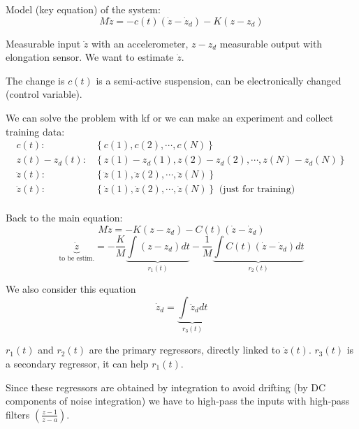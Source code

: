 \begin{exa}
    Model (key equation) of the system:
    \[
        M\ddot{z} = -c(t)(\dot{z}-\dot{z}_d) - K(z-z_d)
    \]

    Measurable input $\ddot{z}$ with an accelerometer, $z-z_d$ measurable output with elongation sensor.
    We want to estimate $\dot{z}$.

    The change is $c(t)$ is a semi-active suspension, can be electronically changed (control variable).

    We can solve the problem with \gls{kf} or we can make an experiment and collect training data:
    \begin{align*}
        c(t)        : & \left\{ c(1), c(2), \cdots, c(N) \right\} \\
        z(t)-z_d(t) : & \left\{ z(1)-z_d(1), z(2)-z_d(2), \cdots, z(N)-z_d(N) \right\} \\
        \ddot{z}(t) : & \left\{ \ddot{z}(1), \ddot{z}(2), \cdots, \ddot{z}(N) \right\} \\
        \dot{z}(t)  : & \left\{ \dot{z}(1), \dot{z}(2), \cdots, \dot{z}(N) \right\} \text{ (just for training)} \\
    \end{align*}


    Back to the main equation:
    \[
        M\ddot{z} = -K(z-z_d)-C(t)(\dot{z}-\dot{z}_d)
    \]
    \[
        \underbrace{\dot{z}}_{\text{to be estim.}} =
        -\frac{K}{M} \underbrace{\int (z-z_d)dt}_{r_1(t)}
        -\frac{1}{M} \underbrace{\int C(t)(\dot{z}-\dot{z}_d)dt}_{r_2(t)}
    \]

    We also consider this equation
    \[
        \dot{z}_d = \underbrace{\int \ddot{z}_d dt}_{r_3(t)}
    \]

    $r_1(t)$ and $r_2(t)$ are the primary regressors, directly linked to $\dot{z}(t)$. $r_3(t)$ is a secondary regressor, it can help $r_1(t)$.

    Since these regressors are obtained by integration to avoid drifting (by DC components of noise integration) we have to high-pass the inputs with high-pass filters $\left(\frac{z-1}{z-a}\right)$.


\end{exa}

